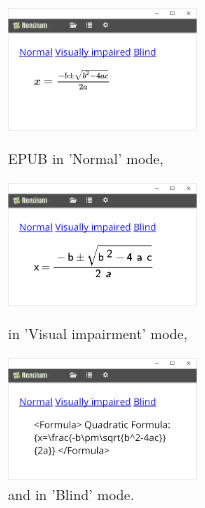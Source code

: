 \documentclass[12pt]{llncs}
\begin{document}
\vspace{-0.6cm} 
\begin{figure}
	\centering
	\begin{minipage}{0.33\textwidth}
		\centering
			\includegraphics[width=50mm]{EquationNo.PNG} 
		\caption{EPUB in 'Normal' mode, }
		\label{fig:epub_normal}
	\end{minipage}\hfill
	\begin{minipage}{0.33\textwidth}
		\centering
		\includegraphics[width=50mm]{EquationVi.PNG} 
		\caption{in 'Visual impairment' mode,}
		\label{fig:epub_viimp}
	\end{minipage}\hfill
	\begin{minipage}{0.33\textwidth}
	\centering
			\includegraphics[width=50mm]{EquationBl.PNG} 
		\caption{and in 'Blind' mode.}
		\label{fig:epub_blind}
	\end{minipage}
\end{figure}
\vspace{-0.6cm} 
\end{document}
